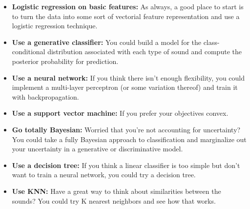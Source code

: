 \documentclass[12pt]{article}
\begin{document}
\begin{itemize}

    \item \textbf{Logistic regression on basic features:} As always, a good place to start is to turn the data into some sort of vectorial feature representation and use a logistic regression technique.
        
    \item \textbf{Use a generative classifier:} You could build a model for the class-conditional distribution associated with each type of sound and compute the posterior probability for prediction.
    
    \item \textbf{Use a neural network:} If you think there isn't enough flexibility, you could implement a multi-layer perceptron (or some variation thereof) and train it with backpropagation.
    
    \item \textbf{Use a support vector machine:} If you prefer your objectives convex.
    
    \item \textbf{Go totally Bayesian:} Worried that you're not accounting for uncertainty?  You could take a fully Bayesian approach to classification and marginalize out your uncertainty in a generative or discriminative model.
    
    \item \textbf{Use a decision tree:} If you think a linear classifier is too simple but don't want to train a neural network, you could try a decision tree.
    
    \item \textbf{Use KNN:} Have a great way to think about similarities between the sounds?  You could try K nearest neighbors and see how that works.
    
\end{itemize}
\end{document}

